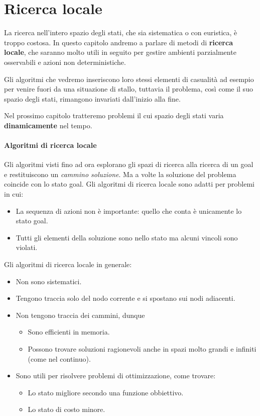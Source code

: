 \chapter{Ricerca locale}
La ricerca nell'intero spazio degli stati, che sia sistematica o con euristica,
\`e troppo costosa. In questo capitolo andremo a parlare di metodi di \textbf{ricerca locale},
che saranno molto utili in seguito per gestire ambienti parzialmente osservabili e azioni non
deterministiche.

Gli algoritmi che vedremo inseriscono loro stessi elementi di casualit\`a ad esempio per venire
fuori da una situazione di stallo, tuttavia il problema, cos\`i come il suo spazio degli stati,
rimangono invariati dall'inizio alla fine.

Nel prossimo capitolo tratteremo problemi il cui spazio degli stati varia \textbf{dinamicamente} nel tempo.

\subsubsection{Algoritmi di ricerca locale}
Gli algoritmi visti fino ad ora esplorano gli spazi di ricerca alla ricerca di un
goal e restituiscono un \emph{cammino soluzione}. Ma a volte la soluzione del problema
coincide con lo stato goal. Gli algoritmi di ricerca locale sono adatti per problemi in
cui:
\begin{itemize}
	\item La sequenza di azioni non \`e importante: quello che conta \`e unicamente
	      lo stato goal.
	\item Tutti gli elementi della soluzione sono nello stato ma alcuni vincoli sono
	      violati.
\end{itemize}
Gli algoritmi di ricerca locale in generale:
\begin{itemize}
	\item Non sono sistematici.
	\item Tengono traccia solo del nodo corrente e si spostano sui nodi adiacenti.
	\item Non tengono traccia dei cammini, dunque
	      \begin{itemize}
		      \item Sono efficienti in memoria.
		      \item Possono trovare soluzioni ragionevoli anche in spazi molto grandi e
		            infiniti (come nel continuo).
	      \end{itemize}
	\item Sono utili per risolvere problemi di ottimizzazione, come trovare:
	      \begin{itemize}
		      \item Lo stato migliore secondo una funzione obbiettivo.
		      \item Lo stato di costo minore.
	      \end{itemize}
\end{itemize}

